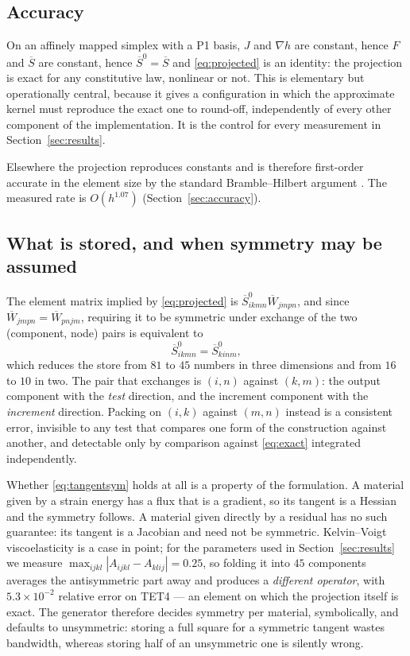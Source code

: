 \documentclass[11pt]{article}
\newcommand{\Wbar}{\overline{W}}
\newcommand{\Sbar}{\overline{S}}
\begin{document}
\subsection{Accuracy}

On an affinely mapped simplex with a P1 basis, $J$ and $\nabla h$ are constant,
hence $F$ and $\Sbar$ are constant, hence $\Sbar^0 = \Sbar$ and
\eqref{eq:projected} is an identity: the projection is exact for any
constitutive law, nonlinear or not.  This is elementary but operationally
central, because it gives a configuration in which the approximate kernel must
reproduce the exact one to round-off, independently of every other component of
the implementation.  It is the control for every measurement in
Section~\ref{sec:results}.

Elsewhere the projection reproduces constants and is therefore first-order
accurate in the element size by the standard Bramble--Hilbert argument
\cite{BrambleHilbert1970,Ciarlet1978}.  The measured rate is $O(h^{1.07})$
(Section~\ref{sec:accuracy}).

\subsection{What is stored, and when symmetry may be assumed}
\label{sec:symmetry}

The element matrix implied by \eqref{eq:projected} is
$\Sbar^0_{ikmn}\Wbar_{jmpn}$, and since $\Wbar_{jmpn} = \Wbar_{pnjm}$, requiring
it to be symmetric under exchange of the two (component, node) pairs is
equivalent to
\begin{equation}
  \Sbar^0_{ikmn} = \Sbar^0_{kinm} ,
  \label{eq:tangentsym}
\end{equation}
which reduces the store from $81$ to $45$ numbers in three dimensions and from
$16$ to $10$ in two.  The pair that exchanges is $(i,n)$ against $(k,m)$: the
output component with the \emph{test} direction, and the increment component
with the \emph{increment} direction.  Packing on $(i,k)$ against $(m,n)$ instead
is a consistent error, invisible to any test that compares one form of the
construction against another, and detectable only by comparison against
\eqref{eq:exact} integrated independently.

Whether \eqref{eq:tangentsym} holds at all is a property of the formulation.  A
material given by a strain energy has a flux that is a gradient, so its tangent
is a Hessian and the symmetry follows.  A material given directly by a residual
has no such guarantee: its tangent is a Jacobian and need not be symmetric.
Kelvin--Voigt viscoelasticity is a case in point; for the parameters used in
Section~\ref{sec:results} we measure
$\max_{ijkl}|A_{ijkl}-A_{klij}| = 0.25$, so folding it into $45$ components
averages the antisymmetric part away and produces a \emph{different operator},
with $5.3\times10^{-2}$ relative error on TET4 --- an element on which the
projection itself is exact.  The generator therefore decides symmetry per
material, symbolically, and defaults to unsymmetric: storing a full square for a
symmetric tangent wastes bandwidth, whereas storing half of an unsymmetric one
is silently wrong.
\end{document}
